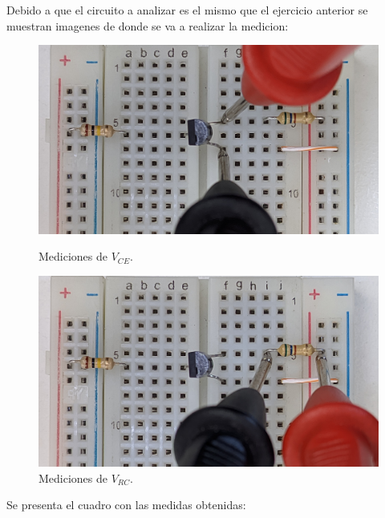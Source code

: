   Debido a que el circuito a analizar es el mismo que el ejercicio anterior se muestran imagenes de donde se va a realizar la medicion:
  \begin{figure}[!ht]

        \begin{minipage}{0.5\textwidth}
            \includegraphics[width=1\textwidth]{tp3/pictures/prot_crkt-3_Vce.jpg}
            \caption{Mediciones de $V_{CE}$.}
 
        \end{minipage}
                    \begin{minipage}{0.5\textwidth}
            \includegraphics[width=1\textwidth]{tp3/pictures/prot_crkt-3_Vrc.jpg}
            \caption{Mediciones de $V_{RC}$.}

        \end{minipage}
        
 
    \end{figure}

    Se presenta el cuadro con las medidas obtenidas:

